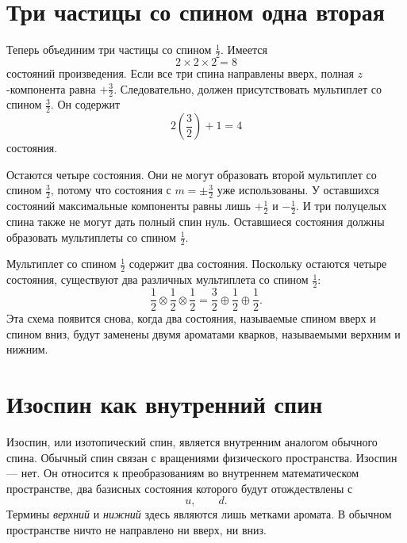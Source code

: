 \section{Три частицы со спином одна вторая}

Теперь объединим три частицы со спином \(\tfrac12\). Имеется
\begin{equation}
2\times2\times2=8
\end{equation}
состояний произведения. Если все три спина направлены вверх, полная \(z\)-компонента равна \(+\tfrac32\). Следовательно, должен присутствовать мультиплет со спином \(\tfrac32\). Он содержит
\begin{equation}
2\left(\frac32\right)+1=4
\end{equation}
состояния.

Остаются четыре состояния. Они не могут образовать второй мультиплет со спином \(\tfrac32\), потому что состояния с \(m=\pm\tfrac32\) уже использованы. У оставшихся состояний максимальные компоненты равны лишь \(+\tfrac12\) и \(-\tfrac12\). И три полуцелых спина также не могут дать полный спин нуль. Оставшиеся состояния должны образовать мультиплеты со спином \(\tfrac12\).

Мультиплет со спином \(\tfrac12\) содержит два состояния. Поскольку остаются четыре состояния, существуют два различных мультиплета со спином \(\tfrac12\):
\begin{equation}
\frac12\otimes\frac12\otimes\frac12
=
\frac32\oplus\frac12\oplus\frac12.
\end{equation}
Эта схема появится снова, когда два состояния, называемые спином вверх и спином вниз, будут заменены двумя ароматами кварков, называемыми верхним и нижним.

\section{Изоспин как внутренний спин}

Изоспин, или изотопический спин, является внутренним аналогом обычного спина. Обычный спин связан с вращениями физического пространства. Изоспин — нет. Он относится к преобразованиям во внутреннем математическом пространстве, два базисных состояния которого будут отождествлены с
\begin{equation}
u,\qquad d.
\end{equation}
Термины \emph{верхний} и \emph{нижний} здесь являются лишь метками аромата. В обычном пространстве ничто не направлено ни вверх, ни вниз.


